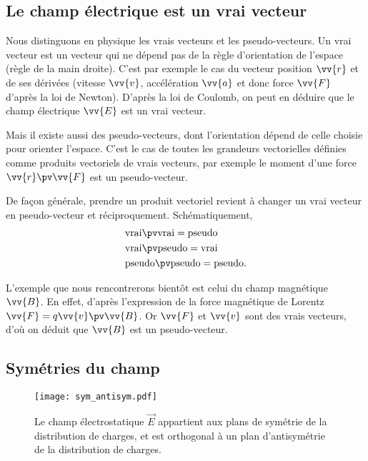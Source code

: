 \documentclass[12pt,fancy]{/Users/victor/Documents/COURS/2ACapECL/texmf/tex/latex/Preambles/cours}
\begin{document}
\subsection{Le champ électrique est un vrai vecteur}
Nous distinguons en physique les vrais vecteurs et les pseudo-vecteurs. Un vrai vecteur est un vecteur qui ne dépend pas de la règle d'orientation de l'espace (règle de la main droite). C'est par exemple le cas du vecteur position $\vv{r}$ et de ses dérivées (vitesse $\vv{v}$, accélération $\vv{a}$ et donc force $\vv{F}$ d'après la loi de Newton). D'après la loi de Coulomb, on peut en déduire que le champ électrique $\vv{E}$ est un vrai vecteur.

Mais il existe aussi des pseudo-vecteurs, dont l'orientation dépend de celle choisie pour orienter l'espace. C'est le cas de toutes les grandeurs vectorielles définies comme produits vectoriels de vrais vecteurs, par exemple le moment d'une force $\vv{r}\pv\vv{F}$ est un pseudo-vecteur.
\begin{remarque}
De façon générale, prendre un produit vectoriel revient à changer un vrai vecteur en pseudo-vecteur et réciproquement. Schématiquement,
\begin{equation*}
\begin{split}
&\text{vrai}\pv\text{vrai}=\text{pseudo}\\
&\text{vrai}\pv\text{pseudo}=\text{vrai}\\
&\text{pseudo}\pv\text{pseudo}=\text{pseudo}.
\end{split}
\end{equation*}
\end{remarque}
L'exemple que nous rencontrerons bientôt est celui du champ magnétique $\vv{B}$. En effet, d'après l'expression de la force magnétique de Lorentz $\vv{F}=q\vv{v}\pv\vv{B}$. Or $\vv{F}$ et $\vv{v}$ sont des vrais vecteurs, d'où on déduit que $\vv{B}$ est un pseudo-vecteur.

\subsection{Symétries du champ}

\begin{figure}[H]
\centering
\texttt{[image: sym\_antisym.pdf]}
\caption{Le champ électrostatique $\vec{E}$ appartient aux plans de symétrie de la distribution de charges, et est orthogonal à un plan d'antisymétrie de la distribution de charges.}
\label{fig:sym_antisym}
\end{figure}
\end{document}
